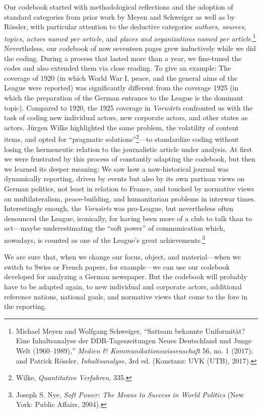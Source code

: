 \documentclass{tufte-handout}
\begin{document}
Our codebook started with methodological reflections and the adoption of
standard categories from prior work by Meyen and Schweiger as well as by
Rössler, with particular attention to the deductive categories
\emph{authors, sources, topics, actors named per article,} and
\emph{places and organizations named per article}.\footnote{Michael
  Meyen and Wolfgang Schweiger, ``Sattsam bekannte Uniformität? Eine
  Inhaltsanalyse der DDR-Tageszeitungen Neues Deutschland und Junge Welt
  (1960--1989),'' \emph{Medien \& Kommunikationswissenschaft} 56, no. 1
  (2017); and Patrick Rössler, \emph{Inhaltsanalyse}, 3rd ed. (Konstanz:
  UVK (UTB), 2017).} Nevertheless, our codebook of now seventeen pages
grew inductively while we did the coding. During a process that lasted
more than a year, we fine-tuned the codes and also extended them via
close reading. To give an example: The coverage of 1920 (in which World
War I, peace, and the general aims of the League were reported) was
significantly different from the coverage 1925 (in which the preparation
of the German entrance to the League is the dominant topic). Compared to
1920, the 1925 coverage in \emph{Vorwärts} confronted us with the task
of coding new individual actors, new corporate actors, and other states
as actors. Jürgen Wilke highlighted the same problem, the volatility of
content items, and opted for ``pragmatic solutions''\footnote{Wilke,
  \emph{Quantitative Verfahren}, 335.}---to standardize coding without
losing the hermeneutic relation to the journalistic article under
analysis. At first we were frustrated by this process of constantly
adapting the codebook, but then we learned its deeper meaning: We saw
how a now-historical journal was dynamically reporting, driven by events
but also by its own partisan views on German politics, not least in
relation to France, and touched by normative views on multilateralism,
peace-building, and humanitarian problems in interwar times.
Interestingly enough, the \emph{Vorwärts} was pro-League, but
nevertheless often denounced the League, ironically, for having been
more of a club to talk than to act---maybe underestimating the ``soft
power'' of communication which, nowadays, is counted as one of the
League's great achievements.\footnote{Joseph S. Nye, \emph{Soft Power:
  The Means to Success in World Politics} (New York: Public Affairs,
  2004).}

We are sure that, when we change our focus, object, and material---when
we switch to Swiss or French papers, for example---we can use our
codebook developed for analyzing a German newspaper. But the codebook
will probably have to be adapted again, to new individual and corporate
actors, additional reference nations, national goals, and normative
views that come to the fore in the reporting.
\end{document}

